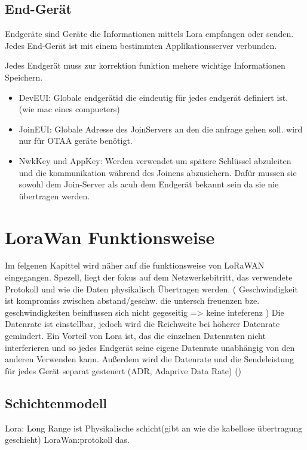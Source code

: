 \documentclass[a4paper,12pt]{article}
\begin{document}
        \subsection{End-Gerät}
            Endgeräte sind Geräte die Informationen mittels Lora empfangen oder senden. Jedes End-Gerät ist mit einem bestimmten Applikationsserver verbunden.
            

            Jedes Endgerät muss zur korrektion funktion mehere wichtige Informationen Speichern.
            \begin{itemize}
                \item DevEUI: Globale endgerätid die eindeutig für jedes endgerät definiert ist. (wie mac eines compueters)
                \item JoinEUI: Globale Adresse des JoinServers an den die anfrage gehen soll. wird nur für OTAA geräte benötigt.
                \item NwkKey und AppKey: Werden verwendet um spätere Schlüssel abzuleiten und die kommunikation während des Joinens abzusichern. Dafür mussen sie sowohl dem Join-Server als acuh dem Endgerät bekannt sein da sie nie übertragen werden.
            \end{itemize}
    \section{LoraWan Funktionsweise}
        Im felgenen Kapittel wird näher auf die funktionsweise von LoRaWAN eingegangen. Spezell, liegt der fokus auf dem Netzwerkebitritt, das verwendete Protokoll und wie die Daten  physikalisch Übertragen werden.
        \cite{LoRaSpec}(
            Geschwindigkeit ist kompromiss zwischen abstand/geschw. die untersch freuenzen bze. geschwindigkeiten beinflussen sich nicht gegeseitig => keine inteferenz
        )
        Die Datenrate ist einstellbar, jedoch wird die Reichweite bei höherer Datenrate gemindert. Ein Vorteil von Lora ist, das die einzelnen Datenraten nicht interferieren und so jedes Endgerät seine eigene Datenrate unabhängig von den anderen Verwenden kann.
        Außerdem wird die Datenrate und die Sendeleistung für jedes Gerät separat gesteuert (ADR, Adaprive Data Rate)
            \cite{LoRaSpec}
            \cite{WhatIsLoRa}()
        \subsection{Schichtenmodell}
            Lora: Long Range ist Physikalische schicht(gibt an wie die kabellose übertragung geschieht)
            LoraWan:protokoll das. 
\end{document}
